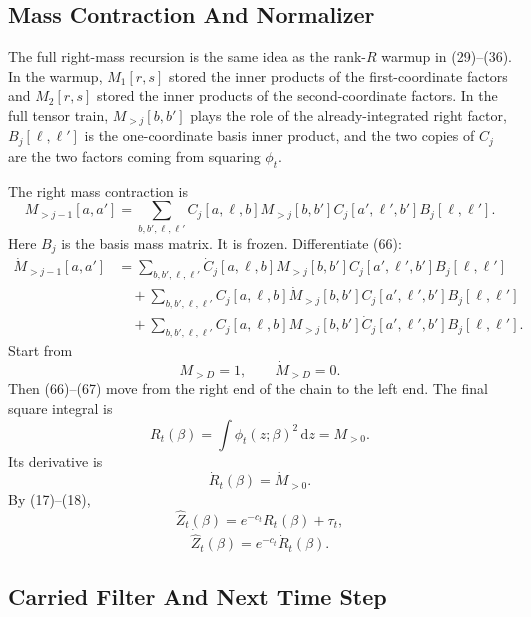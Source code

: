 \documentclass[11pt]{article}
\theoremstyle{remark}
\newcommand{\dd}{\,\mathrm d}
\begin{document}
\subsection{Mass Contraction And Normalizer}

The full right-mass recursion is the same idea as the rank-\(R\) warmup in
(29)--(36).  In the warmup, \(M_1[r,s]\) stored the inner products of the
first-coordinate factors and \(M_2[r,s]\) stored the inner products of the
second-coordinate factors.  In the full tensor train, \(M_{>j}[b,b']\) plays
the role of the already-integrated right factor, \(B_j[\ell,\ell']\) is the
one-coordinate basis inner product, and the two copies of \(C_j\) are the two
factors coming from squaring \(\phi_t\).

The right mass contraction is
\[
    M_{>j-1}[a,a']
    =
    \sum_{b,b',\ell,\ell'}
    C_j[a,\ell,b]
    M_{>j}[b,b']
    C_j[a',\ell',b']
    B_j[\ell,\ell'].
    \tag{66}
\]
Here \(B_j\) is the basis mass matrix.  It is frozen.  Differentiate (66):
\[
\begin{aligned}
    \dot M_{>j-1}[a,a']
    &=
    \sum_{b,b',\ell,\ell'}
    \dot C_j[a,\ell,b]
    M_{>j}[b,b']
    C_j[a',\ell',b']
    B_j[\ell,\ell']\\
    &\quad+
    \sum_{b,b',\ell,\ell'}
    C_j[a,\ell,b]
    \dot M_{>j}[b,b']
    C_j[a',\ell',b']
    B_j[\ell,\ell']\\
    &\quad+
    \sum_{b,b',\ell,\ell'}
    C_j[a,\ell,b]
    M_{>j}[b,b']
    \dot C_j[a',\ell',b']
    B_j[\ell,\ell'].
\end{aligned}
\tag{67}
\]
Start from
\[
    M_{>D}=1,
    \qquad
    \dot M_{>D}=0.
    \tag{68}
\]
Then (66)--(67) move from the right end of the chain to the left end.  The
final square integral is
\[
    R_t(\beta)=\int\phi_t(z;\beta)^2\dd z=M_{>0}.
    \tag{69}
\]
Its derivative is
\[
    \dot R_t(\beta)=\dot M_{>0}.
    \tag{70}
\]
By (17)--(18),
\[
    \widehat Z_t(\beta)=e^{-c_t}R_t(\beta)+\tau_t,
    \tag{71}
\]
\[
    \dot{\widehat Z}_t(\beta)=e^{-c_t}\dot R_t(\beta).
    \tag{72}
\]

\subsection{Carried Filter And Next Time Step}
\end{document}
